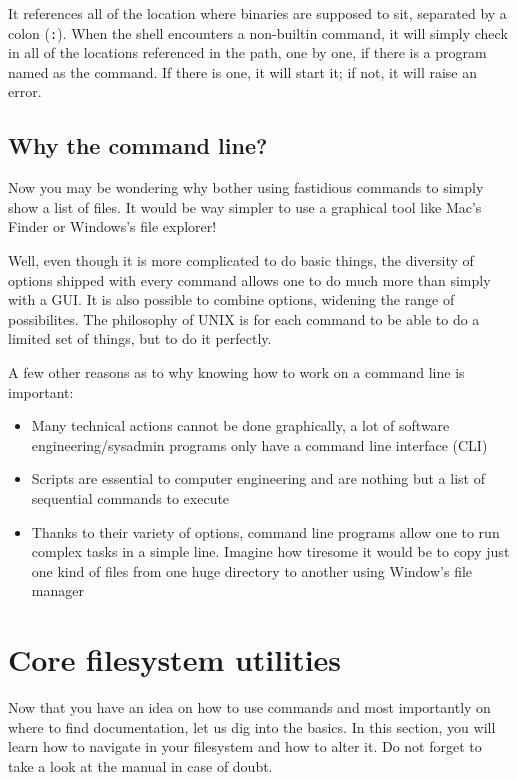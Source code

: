 \documentclass[12pt]{article}
\begin{document}
It references all of the location where binaries are supposed to sit, separated by a colon (\texttt{:}).
When the shell encounters a non-builtin command, it will simply check in all of the locations referenced in the path, one by one, if there is a program named as the command. If there is one, it will start it; if not, it will raise an error.

\subsection{Why the command line?}

Now you may be wondering why bother using fastidious commands to simply show a list of files. It would be way simpler to use a graphical tool like Mac's Finder or Windows's file explorer!

Well, even though it is more complicated to do basic things, the diversity of options shipped with every command allows one to do much more than simply with a GUI.
It is also possible to combine options, widening the range of possibilites.
The philosophy of UNIX is for each command to be able to do a limited set of things, but to do it perfectly.

A few other reasons as to why knowing how to work on a command line is important:
\begin{itemize}
\item Many technical actions cannot be done graphically, a lot of software engineering/sysadmin programs only have a command line interface (CLI)
\item Scripts are essential to computer engineering and are nothing but a list of sequential commands to execute
\item Thanks to their variety of options, command line programs allow one to run complex tasks in a simple line. Imagine how tiresome it would be to copy just one kind of files from one huge directory to another using Window's file manager
\end{itemize}


\section{Core filesystem utilities}

Now that you have an idea on how to use commands and most importantly on where to find documentation, let us dig into the basics.
In this section, you will learn how to navigate in your filesystem and how to alter it.
Do not forget to take a look at the manual in case of doubt.
\end{document}
